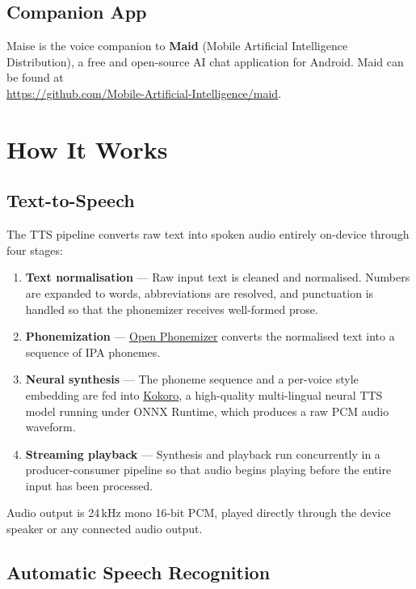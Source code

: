 \documentclass[12pt,a4paper]{article}
\begin{document}
\subsection{Companion App}

Maise is the voice companion to \textbf{Maid} (Mobile Artificial Intelligence Distribution), a free and open-source AI chat application for Android. Maid can be found at\\
\url{https://github.com/Mobile-Artificial-Intelligence/maid}.

\section{How It Works}

\subsection{Text-to-Speech}

The TTS pipeline converts raw text into spoken audio entirely on-device through four stages:

\begin{enumerate}
    \item \textbf{Text normalisation} — Raw input text is cleaned and normalised. Numbers are expanded to words, abbreviations are resolved, and punctuation is handled so that the phonemizer receives well-formed prose.
    \item \textbf{Phonemization} — \href{https://github.com/NeuralVox/OpenPhonemizer}{Open Phonemizer} converts the normalised text into a sequence of IPA phonemes.
    \item \textbf{Neural synthesis} — The phoneme sequence and a per-voice style embedding are fed into \href{https://github.com/hexgrad/kokoro}{Kokoro}, a high-quality multi-lingual neural TTS model running under ONNX Runtime, which produces a raw PCM audio waveform.
    \item \textbf{Streaming playback} — Synthesis and playback run concurrently in a producer-consumer pipeline so that audio begins playing before the entire input has been processed.
\end{enumerate}

Audio output is 24\,kHz mono 16-bit PCM, played directly through the device speaker or any connected audio output.

\subsection{Automatic Speech Recognition}
\end{document}
